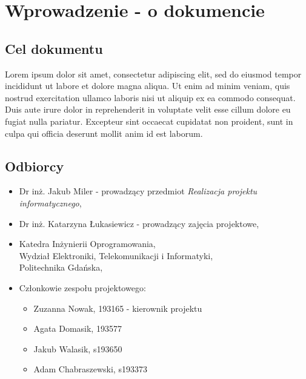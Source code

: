 \documentclass[12pt,a4paper,colorlinks=true,linkcolor=NavyBlue,citecolor=red,urlcolor=NavyBlue]{book}
\begin{document}


\tableofcontents

\chapter{Wprowadzenie - o dokumencie}
\section{Cel dokumentu}
Lorem ipsum dolor sit amet, consectetur adipiscing elit, sed do eiusmod tempor incididunt ut labore et dolore magna aliqua. Ut enim ad minim veniam, quis nostrud exercitation ullamco laboris nisi ut aliquip ex ea commodo consequat. Duis aute irure dolor in reprehenderit in voluptate velit esse cillum dolore eu fugiat nulla pariatur. Excepteur sint occaecat cupidatat non proident, sunt in culpa qui officia deserunt mollit anim id est laborum.

\section{Odbiorcy}

\begin{itemize}
    \item Dr inż. Jakub Miler - prowadzący przedmiot \textit{Realizacja projektu informatycznego},
    \item Dr inż. Katarzyna Łukasiewicz - prowadzący zajęcia projektowe,
    \item Katedra Inżynierii Oprogramowania, \\[2mm] 
Wydział Elektroniki, Telekomunikacji i Informatyki, \\[2mm]  
Politechnika Gdańska,
    \item Członkowie zespołu projektowego:
    \begin{itemize}
        \item[] Zuzanna Nowak, 193165 - kierownik projektu
        \item[] Agata Domasik, 193577
        \item[] Jakub Walasik, s193650
        \item[] Adam Chabraszewski, s193373
    \end{itemize}
\end{itemize}
\end{document}
